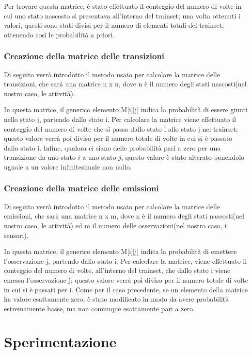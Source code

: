 \documentclass[10pt,a4paper]{article}
\begin{document}
	Per trovare questa matrice, è stato effettuato il conteggio del numero di volte in cui uno stato nascosto si presentava all'interno del trainset; una volta ottenuti i valori, questi sono stati divisi per il numero di elementi totali del trainset, ottenendo così le probabilità a priori.
	
	\subsubsection{Creazione della matrice delle transizioni}
	Di seguito verrà introdotto il metodo usato per calcolare la matrice delle transizioni, che sarà una matrice  n x n, dove n è il numero degli stati nascosti(nel nostro caso, le attività).
	
	In questa matrice, il generico elemento M[i][j] indica la probabilità di essere giunti nello stato j, partendo dallo stato i. Per calcolare la matrice viene effettuato il conteggio del numero di volte che si passa dallo stato i allo stato j nel trainset; questo valore verrà poi diviso per il numero totale di volte in cui si è passato dallo stato i. Infine, qualora ci siano delle probabilità pari a zero per una transizione da uno stato $i$ a uno stato $j$, questo valore è stato alterato ponendolo uguale a un valore infinitesimale non nullo.
	
	\subsubsection{Creazione della matrice delle emissioni}
	Di seguito verrà introdotto il metodo usato per calcolare la matrice delle emissioni, che sarà una matrice  n x m, dove n è il numero degli stati nascosti(nel nostro caso, le attività) ed m il numero delle osservazioni(nel nostro caso, i sensori).
	
	In questa matrice, il generico elemento M[i][j] indica la probabilità di emettere l'osservazione j, partendo dallo stato i. Per calcolare la matrice, viene effettuato il conteggio del numero di volte, all'interno del trainset, che dallo stato i viene emessa l'osservazione j; questo valore verrà poi diviso per il numero totale di volte in cui si è passati per i. Come per il caso precedente, se un elemento della matrice ha valore esattamente zero, è stato modificato in modo da avere probabilità estremamente basse, ma non comunque esattamente pari a zero.
	
	\section{Sperimentazione}
	
\end{document}
